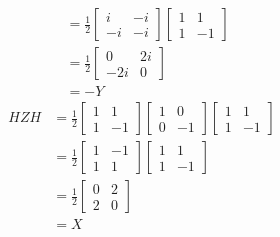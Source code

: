 \documentclass[a4paper,12pt]{article}
\begin{document}
\begin{enumerate}
\begin{align*}
            &= \frac{1}{2}
            \left[ \begin{array}{cc}
                i & -i \\
                -i & -i
            \end{array} \right]
            \left[ \begin{array}{cc}
                1 & 1 \\
                1 & -1
            \end{array} \right] \\
            &= \frac{1}{2}
            \left[ \begin{array}{cc}
                0 & 2i \\
                -2i & 0
            \end{array} \right] \\
            &= -Y
        \end{align*}
        \begin{align*}
            HZH &= \frac{1}{2}
            \left[ \begin{array}{cc}
                1 & 1 \\
                1 & -1
            \end{array} \right]
            \left[ \begin{array}{cc}
                1 & 0 \\
                0 & -1
            \end{array} \right]
            \left[ \begin{array}{cc}
                1 & 1 \\
                1 & -1
            \end{array} \right] \\
            &= \frac{1}{2}
            \left[ \begin{array}{cc}
                1 & -1 \\
                1 & 1
            \end{array} \right]
            \left[ \begin{array}{cc}
                1 & 1 \\
                1 & -1
            \end{array} \right] \\
            &= \frac{1}{2}
            \left[ \begin{array}{cc}
                0 & 2 \\
                2 & 0
            \end{array} \right] \\
            &= X
        \end{align*}


\end{enumerate}
\end{document}
